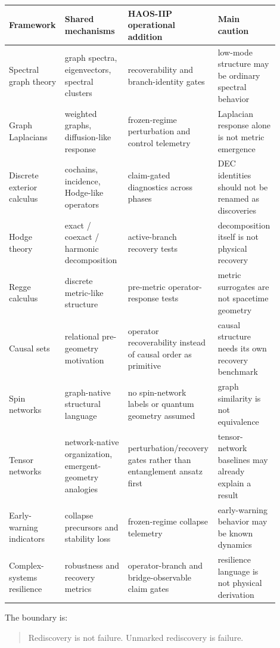 \documentclass[11pt]{article}
\begin{document}
\begin{longtable}{p{0.20\linewidth}p{0.23\linewidth}p{0.27\linewidth}p{0.20\linewidth}}
\toprule
Framework & Shared mechanisms & HAOS-IIP operational addition & Main caution \\
\midrule
\endhead
Spectral graph theory & graph spectra, eigenvectors, spectral clusters & recoverability and branch-identity gates & low-mode structure may be ordinary spectral behavior \\
Graph Laplacians & weighted graphs, diffusion-like response & frozen-regime perturbation and control telemetry & Laplacian response alone is not metric emergence \\
Discrete exterior calculus & cochains, incidence, Hodge-like operators & claim-gated diagnostics across phases & DEC identities should not be renamed as discoveries \\
Hodge theory & exact / coexact / harmonic decomposition & active-branch recovery tests & decomposition itself is not physical recovery \\
Regge calculus & discrete metric-like structure & pre-metric operator-response tests & metric surrogates are not spacetime geometry \\
Causal sets & relational pre-geometry motivation & operator recoverability instead of causal order as primitive & causal structure needs its own recovery benchmark \\
Spin networks & graph-native structural language & no spin-network labels or quantum geometry assumed & graph similarity is not equivalence \\
Tensor networks & network-native organization, emergent-geometry analogies & perturbation/recovery gates rather than entanglement ansatz first & tensor-network baselines may already explain a result \\
Early-warning indicators & collapse precursors and stability loss & frozen-regime collapse telemetry & early-warning behavior may be known dynamics \\
Complex-systems resilience & robustness and recovery metrics & operator-branch and bridge-observable claim gates & resilience language is not physical derivation \\
\bottomrule
\end{longtable}

The boundary is:

\begin{quote}
Rediscovery is not failure. Unmarked rediscovery is failure.
\end{quote}
\end{document}
